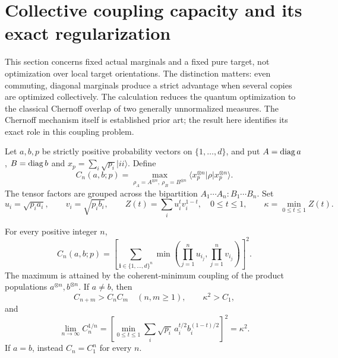 \section{Collective coupling capacity and its exact regularization}
\label{sec:collective-capacity}

This section concerns fixed actual marginals and a fixed pure target, not
optimization over local target orientations. The distinction matters:
even commuting, diagonal marginals produce a strict advantage when several
copies are optimized collectively. The calculation reduces the quantum
optimization to the classical Chernoff overlap of two generally
unnormalized measures. The Chernoff mechanism itself is established prior
art; the result here identifies its exact role in this coupling problem.

Let $a,b,p$ be strictly positive probability vectors on $\{1,\ldots,d\}$,
and put $A=\operatorname{diag} a$, $B=\operatorname{diag} b$ and
$x_p=\sum_i\sqrt{p_i}|ii\rangle$. Define
\[
 C_n(a,b;p)=\max_{\rho_A=A^{\otimes n},\ \rho_B=B^{\otimes n}}
       \langle x_p^{\otimes n}|\rho|x_p^{\otimes n}\rangle.
\]
The tensor factors are grouped across the bipartition
$A_1\cdots A_n:B_1\cdots B_n$. Set
\[
 u_i=\sqrt{p_i a_i},\qquad v_i=\sqrt{p_i b_i},\qquad
 Z(t)=\sum_i u_i^t v_i^{1-t},\quad 0\le t\le1,
 \qquad \kappa=\min_{0\le t\le1}Z(t).
\]

\begin{theorem}
\label{thm:collective-capacity}
For every positive integer $n$,
\begin{equation}\label{eq:collective-exact}
 C_n(a,b;p)=\left[\sum_{\boldsymbol i\in\{1,\ldots,d\}^n}
          \min\left(\prod_{j=1}^n u_{i_j},
                     \prod_{j=1}^n v_{i_j}\right)\right]^2.
\end{equation}
The maximum is attained by the coherent-minimum coupling of the product
populations $a^{\otimes n},b^{\otimes n}$. If $a\ne b$, then
\begin{equation}\label{eq:collective-strict}
 C_{n+m}>C_n C_m \quad(n,m\ge1),\qquad
 \kappa^2>C_1,
\end{equation}
and
\begin{equation}\label{eq:collective-rate}
 \boxed{\displaystyle
 \lim_{n\to\infty} C_n^{1/n}
   =\left[\min_{0\le t\le1}
       \sum_i\sqrt{p_i}\,a_i^{t/2}b_i^{(1-t)/2}\right]^2
   =\kappa^2.}
\end{equation}
If $a=b$, instead $C_n=C_1^n$ for every $n$.
\end{theorem}

